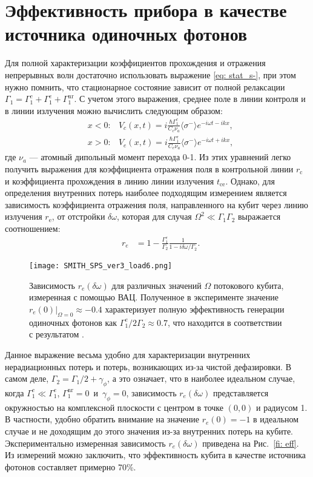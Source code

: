 \section{Эффективность прибора в качестве источника одиночных фотонов}
Для полной характеризации коэффициентов прохождения и отражения непрерывных волн достаточно использовать выражение \eqref{eq: stat_s-}, при этом нужно помнить, что стационарное состояние зависит от полной релаксации $\Gamma_1 = \Gamma_1^c + \Gamma_1^e + \Gamma_1^{\text{nr}}$. С учетом этого выражения, среднее поле в линии контроля и в линии излучения \cite{peng2016tuneable} можно вычислить следующим образом:
\begin{subequations}\label{coherentwaves}
	\begin{eqnarray}
		&x < 0: &V_{c}(x,t)=i\frac{\hbar\Gamma_1^{c}}{C_{c} \nu_{a}}\langle\sigma^{-}\rangle e^{-i\omega t - ikx}, \\
		&x > 0:  &V_{e}(x,t)=i\frac{\hbar\Gamma_1^{e}}{C_{e} \nu_{a}}\langle\sigma^{-}\rangle e^{-i\omega t + ikx},
	\end{eqnarray}
\end{subequations}
где $\nu_a$ --- атомный дипольный момент перехода 0-1. 
Из этих уравнений легко получить выражения для коэффициента отражения поля в контрольной линии $r_{\text{c}}$ и коэффициента прохождения в линию линии излучения $t_{\text{ce}}$. Однако, для определения внутренних потерь наиболее подходящим измерением является зависимость коэффициента отражения поля, направленного на кубит через линию излучения $r_{\text{e}}$, от отстройки $\delta\omega$, которая для случая $\Omega^2\ll\Gamma_1\Gamma_2$ выражается соотношением:
\begin{eqnarray}
	&r_e& = 1-\frac{\Gamma_1^e}{\Gamma_2}\frac{1}{1-i\delta\omega/\Gamma_2}.\label{re}
\end{eqnarray}
\begin{figure}[!h]
	\centering
	\texttt{[image: SMITH\_SPS\_ver3\_load6.png]}
	\caption[Зависимость $r_e(\delta\omega)$, измеренная с помощью ВАЦ]{Зависимость $r_e(\delta\omega)$ для различных значений $\Omega$ потокового кубита, измеренная с помощью ВАЦ. Полученное в эксперименте значение $\left. r_e(0)\right\vert_{\Omega=0}\approx-0.4$ характеризует полную эффективность генерации одиночных фотонов как $\Gamma^e_1/2\Gamma_2 \approx 0.7$, что находится в соответствии с результатом \cite{peng2016tuneable}. }
	\label{fig: eff}
\end{figure}
Данное выражение весьма удобно для характеризации внутренних нерадиационных потерь и потерь, возникающих из-за чистой дефазировки. В самом деле, $\Gamma_2 = \Gamma_1/2 + \gamma_\phi $, а это означает, что в наиболее идеальном случае, когда $\Gamma_1^c \ll \Gamma_1^e$, $\Gamma_1^{\text{nr}}=0$~и~$\gamma_\phi=0$, зависимость $r_e(\delta\omega)$ представляется окружностью на комплексной плоскости с центром в точке $(0,0)$ и радиусом 1. В частности, удобно обратить внимание на значение $r_e(0)=-1$ в идеальном случае и не доходящим до этого значения из-за внутренних потерь на кубите. Экспериментально измеренная зависимость $r_e(\delta\omega)$ приведена на Рис.~\ref{fi: eff}. Из измерений можно заключить, что эффективность кубита в качестве источника фотонов составляет примерно 70\%. 

